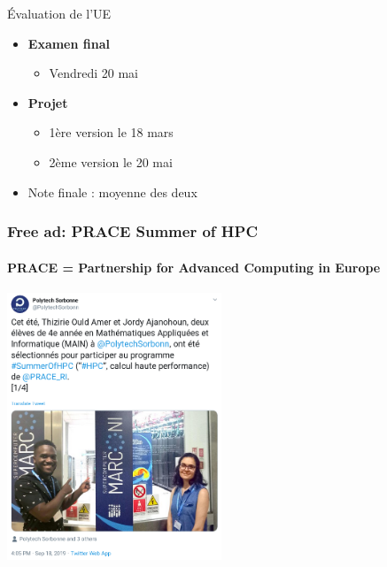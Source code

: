 \documentclass[10pt]{beamer}
\begin{document}
\begin{frame}
  \begin{block}{Évaluation de l'UE}
    \begin{itemize}
    \item \textbf{Examen final} 
      \begin{itemize}
      \item Vendredi 20 mai
      \end{itemize}

      \medskip
      
    \item \textbf{Projet} 
      \begin{itemize}
      \item 1ère version le 18 mars
      \item 2ème version le 20 mai
      \end{itemize}
      
      \medskip
      
    \item Note finale : moyenne des deux
    \end{itemize}
  \end{block}
\end{frame}


 \begin{frame}
   \frametitle{Free ad: PRACE Summer of HPC}
   \framesubtitle{PRACE = Partnership for Advanced Computing in Europe}
   \centering
   \includegraphics[height=8cm]{PRACE_twitter.png}
 \end{frame}
\end{document}

